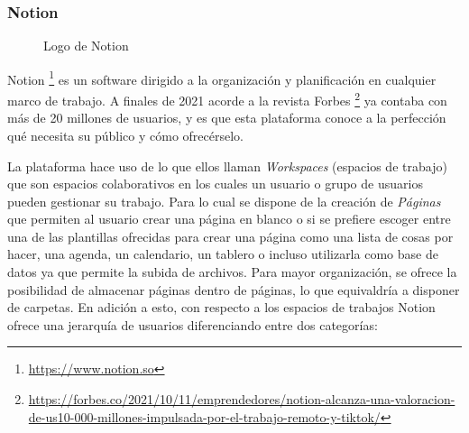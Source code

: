 \subsubsection*{Notion}
\begin{figure}[H]
    \caption{Logo de Notion}
    \label{fig:logo-notion}
\end{figure}

Notion \footnote{\url{https://www.notion.so}} es un software dirigido a la organización y planificación en cualquier marco de trabajo. A finales de 2021 acorde a la revista Forbes \footnote{\url{https://forbes.co/2021/10/11/emprendedores/notion-alcanza-una-valoracion-de-us10-000-millones-impulsada-por-el-trabajo-remoto-y-tiktok/}} ya contaba con más de 20 millones de usuarios, y es que esta plataforma conoce a la perfección qué necesita su público y cómo ofrecérselo. \bigskip

La plataforma hace uso de lo que ellos llaman \textit{Workspaces} \label{notion-workspaces} (espacios de trabajo) que son espacios colaborativos en los cuales un usuario o grupo de usuarios pueden gestionar su trabajo. Para lo cual se dispone de la creación de \textit{Páginas} que permiten al usuario crear una página en blanco o si se prefiere escoger entre una de las plantillas ofrecidas para crear una página como una lista de cosas por hacer, una agenda, un calendario, un tablero o incluso utilizarla como base de datos ya que permite la subida de archivos. Para mayor organización, se ofrece la posibilidad de almacenar páginas dentro de páginas, lo que equivaldría a disponer de carpetas. En adición a esto, con respecto a los espacios de trabajos Notion ofrece una jerarquía de usuarios diferenciando entre dos categorías:

